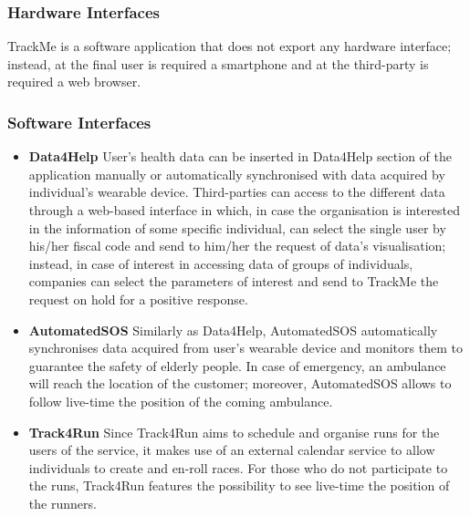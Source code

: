 \documentclass{article}
\begin{document}
	\newpage
	\subsubsection{Hardware Interfaces}
	TrackMe is a software application that does not export any 
	hardware interface; instead, at the final user is required a 
	smartphone and at the third-party is required a web browser. 
			
	\subsubsection{Software Interfaces}
	\begin{itemize}
		\item \textbf{Data4Help} \newline 
		User's health data can be inserted in Data4Help section of the
		application manually or automatically synchronised with data
		acquired by individual's wearable device. \newline
		Third-parties can access to the different data through a 
		web-based interface in which, in case the organisation is 
		interested in the information of some specific individual, 
		can select the single user by his/her fiscal code and send to
		him/her the request of data's visualisation; instead, in 
		case of interest in accessing data of groups of individuals, 
		companies can select the parameters of interest and send to 
		TrackMe the request on hold for a positive response.
		\item \textbf{AutomatedSOS} \newline
		Similarly as Data4Help, AutomatedSOS automatically 
		synchronises data acquired from user's wearable device and 
		monitors them to guarantee the safety of elderly people. 
		\newline
		In case of emergency, an ambulance will reach the location
		of the customer; moreover, AutomatedSOS allows to follow 
		live-time the position of the coming ambulance. 
		\item \textbf{Track4Run} \newline
		Since Track4Run aims to schedule and organise runs for the 
		users of the service, it makes use of an external calendar
		service to allow individuals to create and en-roll races. 
		\newline
		For those who do not participate to the runs, Track4Run 
		features the possibility to see live-time the position of
		the runners.
	\end{itemize} 
	
\end{document}

